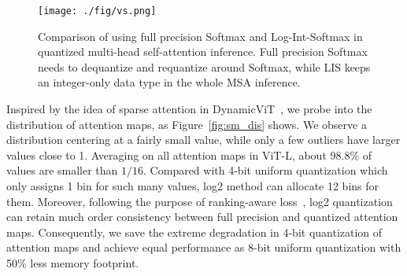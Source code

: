 \documentclass{article}
\begin{document}
\begin{figure}[t]
\centering
\texttt{[image: ./fig/vs.png]}
\vskip 0.03in
\caption{Comparison of using full precision Softmax and Log-Int-Softmax in quantized multi-head self-attention inference. Full precision Softmax needs to dequantize and requantize around Softmax, while LIS keeps an integer-only data type in the whole MSA inference.}
\label{fig:com_sm}
\end{figure}




Inspired by the idea of sparse attention in DynamicViT~\cite{rao2021dynamicvit}, we probe into the distribution of attention maps, as Figure~\ref{fig:sm_dis} shows. We observe a distribution centering at a fairly small value, while only a few outliers have larger values close to 1. Averaging on all attention maps in ViT-L, about 98.8\% of values are smaller than $1/16$. Compared with 4-bit uniform quantization which only assigns 1 bin for such many values, log2 method can allocate 12 bins for them. Moreover, following the purpose of ranking-aware loss~\cite{liu2021post}, log2 quantization can retain much order consistency between full precision and quantized attention maps. Consequently, we save the extreme degradation in 4-bit quantization of attention maps and achieve equal performance as 8-bit uniform quantization with 50\% less memory footprint.
\end{document}
